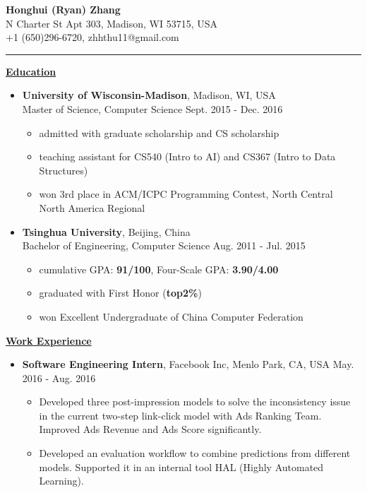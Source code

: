 \documentclass[11pt]{article}
\begin{document}
\begin{CJK}{GBK}{kai}
\begin{center}
  {\textbf{\huge Honghui (Ryan) Zhang}}\\ N Charter St Apt 303, Madison, WI 53715, USA\\
  +1 (650)296-6720, zhhthu11@gmail.com\\
\end{center}
\rule[4pt]{18.5cm}{0.5pt}
{ \textbf{\underline{Education}}}\\\medskip
\begin{itemize}
  \item \textbf{University of Wisconsin-Madison}, Madison, WI, USA\\
  Master of Science, Computer Science  \hfill Sept. 2015 - Dec. 2016\\
    \begin{itemize}
    \item admitted with graduate scholarship and CS scholarship
    \item teaching assistant for CS540 (Intro to AI) and CS367 (Intro to Data Structures)
    \item won 3rd place in ACM/ICPC Programming Contest, North Central North America Regional\\\medskip
    \end{itemize}
 \item \textbf{Tsinghua University}, Beijing, China\\
 Bachelor of Engineering, Computer Science \hfill Aug. 2011 - Jul. 2015\\
    \begin{itemize}
    \item cumulative GPA: \textbf{91/100}, Four-Scale GPA: \textbf{3.90/4.00}
    \item graduated with First Honor (\textbf{top2\%})
    \item won Excellent Undergraduate of China Computer Federation
    \end{itemize}
\end{itemize}

\bigskip

{\textbf{\underline{Work Experience}}}\\\medskip

\begin{itemize}
   \item \textbf{Software Engineering Intern}, Facebook Inc, Menlo Park, CA, USA \hfill May. 2016 - Aug. 2016\\
     \begin{itemize}
     \item Developed three post-impression models to solve the inconsistency issue in the current two-step link-click model with Ads Ranking Team. Improved Ads Revenue and Ads Score significantly. 
     \item Developed an evaluation workflow to combine predictions from different models. Supported it in an internal tool HAL (Highly Automated Learning).\\\medskip
     \end{itemize}


\end{itemize}
\end{CJK}
\end{document}
